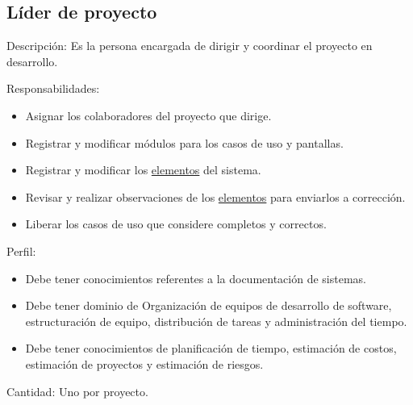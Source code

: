 \begin{Usuario}{\hypertarget{jefe}{\subsection{Líder de proyecto}}}{
}
	\item[Descripción:]
	Es la persona encargada de dirigir y coordinar el proyecto en desarrollo.
    \item[Responsabilidades:] \cdtEmpty
    \begin{itemize}
		\item Asignar los colaboradores del proyecto que dirige.
		\item Registrar y modificar módulos para los casos de uso y pantallas.
		\item Registrar y modificar los \hyperlink{tElemento}{elementos} del sistema.
		\item Revisar y realizar observaciones de los \hyperlink{tElemento}{elementos} para enviarlos a corrección.
		\item Liberar los casos de uso que considere completos y correctos.
    \end{itemize}

	\item[Perfil:] \cdtEmpty
    \begin{itemize}
		\item Debe tener conocimientos referentes a la documentación de sistemas.
		\item Debe tener dominio de Organización de equipos de desarrollo de software, estructuración de equipo, distribución de tareas y administración del tiempo.
		\item Debe tener conocimientos de planificación de tiempo, estimación de costos, estimación de proyectos y estimación de riesgos.
    \end{itemize}
    \item[Cantidad: ]
    Uno por proyecto.
\end{Usuario}


